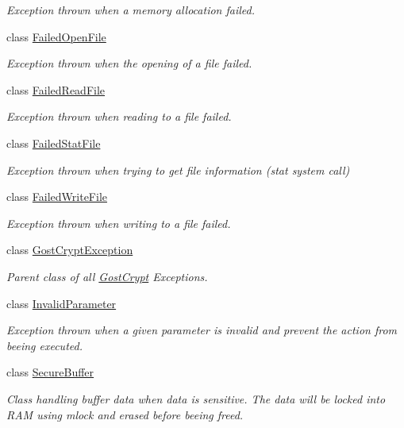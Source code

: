 \begin{DoxyCompactItemize}
\begin{DoxyCompactList}\small\item\em Exception thrown when a memory allocation failed. \end{DoxyCompactList}\item 
class \hyperlink{class_gost_crypt_1_1_failed_open_file}{Failed\+Open\+File}
\begin{DoxyCompactList}\small\item\em Exception thrown when the opening of a file failed. \end{DoxyCompactList}\item 
class \hyperlink{class_gost_crypt_1_1_failed_read_file}{Failed\+Read\+File}
\begin{DoxyCompactList}\small\item\em Exception thrown when reading to a file failed. \end{DoxyCompactList}\item 
class \hyperlink{class_gost_crypt_1_1_failed_stat_file}{Failed\+Stat\+File}
\begin{DoxyCompactList}\small\item\em Exception thrown when trying to get file information (stat system call) \end{DoxyCompactList}\item 
class \hyperlink{class_gost_crypt_1_1_failed_write_file}{Failed\+Write\+File}
\begin{DoxyCompactList}\small\item\em Exception thrown when writing to a file failed. \end{DoxyCompactList}\item 
class \hyperlink{class_gost_crypt_1_1_gost_crypt_exception}{Gost\+Crypt\+Exception}
\begin{DoxyCompactList}\small\item\em Parent class of all \hyperlink{namespace_gost_crypt}{Gost\+Crypt} Exceptions. \end{DoxyCompactList}\item 
class \hyperlink{class_gost_crypt_1_1_invalid_parameter}{Invalid\+Parameter}
\begin{DoxyCompactList}\small\item\em Exception thrown when a given parameter is invalid and prevent the action from beeing executed. \end{DoxyCompactList}\item 
class \hyperlink{class_gost_crypt_1_1_secure_buffer}{Secure\+Buffer}
\begin{DoxyCompactList}\small\item\em Class handling buffer data when data is sensitive. The data will be locked into R\+AM using mlock and erased before beeing freed. \end{DoxyCompactList}\item 

\end{DoxyCompactItemize}
